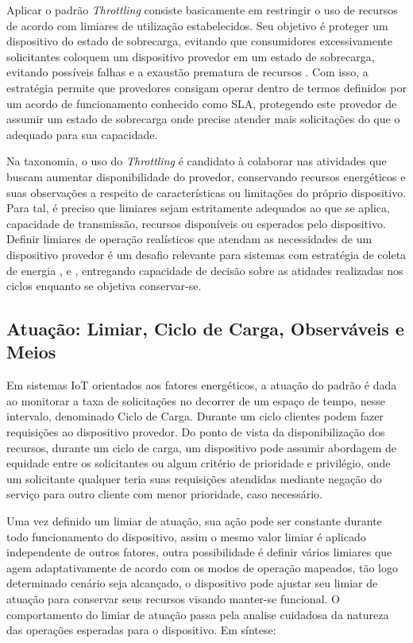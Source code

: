 Aplicar o padrão \textit{Throttling} consiste basicamente em restringir o uso de recursos de acordo com limiares de utilização estabelecidos. Seu objetivo é proteger um dispositivo do estado de sobrecarga, evitando que consumidores excessivamente solicitantes coloquem um dispositivo provedor em um estado de sobrecarga, evitando possíveis falhas e a exaustão prematura de recursos \cite{martinekuan_throttling_nodate}. Com isso, a estratégia permite que provedores consigam operar dentro de termos definidos por um acordo de funcionamento conhecido como \acf{SLA}, protegendo este provedor de assumir um estado de sobrecarga onde precise atender mais solicitações do que o adequado para sua capacidade.

Na taxonomia, o uso do \textit{Throttling} é candidato à colaborar nas atividades que buscam aumentar disponibilidade do provedor, conservando  recursos energéticos e suas observações a respeito de características ou limitações do próprio dispositivo. Para tal, é preciso que limiares sejam estritamente adequados ao que se aplica, capacidade de transmissão, recursos disponíveis ou esperados pelo dispositivo. Definir limiares de operação realísticos que atendam as necessidades de um dispositivo provedor é um desafio relevante para sistemas com estratégia de coleta de energia \cite{khairnar_discrete-rate_2015}, \cite{liu_energy_2016} e \cite{zhang_toward_2018}, entregando capacidade de decisão sobre as atidades realizadas nos ciclos enquanto se objetiva conservar-se.

\subsection{Atuação: Limiar, Ciclo de Carga, Observáveis e Meios}
\label{cap4:atuação}
Em sistemas \acs{IoT} orientados aos fatores energéticos, a atuação do padrão é dada ao monitorar a taxa de solicitações no decorrer de um espaço de tempo, nesse intervalo, denominado Ciclo de Carga. Durante um ciclo clientes podem fazer requisições ao dispositivo provedor. Do ponto de vista da disponibilização dos recursos, durante um ciclo de carga, um dispositivo pode assumir abordagem de equidade entre os solicitantes ou algum critério de prioridade e privilégio, onde um solicitante qualquer teria suas requisições atendidas mediante negação do serviço para outro cliente com menor prioridade, caso necessário.

Uma vez definido um limiar de atuação, sua ação pode ser constante durante todo funcionamento do dispositivo, assim o mesmo valor limiar é aplicado independente de outros fatores, outra possibilidade é definir vários limiares que agem adaptativamente de acordo com os modos de operação mapeados, tão logo determinado cenário seja alcançado, o dispositivo pode ajustar seu limiar de atuação para conservar seus recursos visando manter-se funcional. O comportamento do limiar de atuação passa pela analise cuidadosa da natureza das operações esperadas para o dispositivo. Em síntese:

